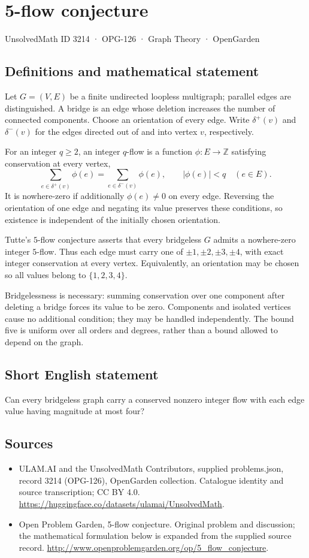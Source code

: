 \documentclass[11pt,a4paper]{article}
\begin{document}
\section*{5-flow conjecture}\label{3214}
{\small UnsolvedMath ID 3214 · OPG-126 · Graph Theory · OpenGarden}
\subsection{Definitions and mathematical statement}
Let $G=(V,E)$ be a finite undirected
loopless multigraph; parallel edges
are distinguished. A bridge is an
edge whose deletion increases the
number of connected components.
Choose an orientation of every edge.
Write $\delta^+(v)$ and $\delta^-(v)$
for the edges directed out of and
into vertex $v$, respectively.

For an integer $q\geq2$, an integer
$q$-flow is a function $\phi:E\to\mathbb Z$
satisfying conservation at every vertex,
\[
 \sum_{e\in\delta^+(v)}\phi(e)
 =\sum_{e\in\delta^-(v)}\phi(e),
 \qquad |\phi(e)|<q\quad(e\in E).
\]
It is nowhere-zero if additionally
$\phi(e)\neq0$ on every edge.
Reversing the orientation of one
edge and negating its value preserves
these conditions, so existence is
independent of the initially chosen
orientation.

Tutte's $5$-flow conjecture asserts
that every bridgeless $G$ admits a
nowhere-zero integer $5$-flow. Thus
each edge must carry one of
$\pm1,\pm2,\pm3,\pm4$, with exact
integer conservation at every vertex.
Equivalently, an orientation may be
chosen so all values belong to
$\{1,2,3,4\}$.

Bridgelessness is necessary: summing
conservation over one component after
deleting a bridge forces its value
to be zero. Components and isolated
vertices cause no additional condition;
they may be handled independently.
The bound five is uniform over all
orders and degrees, rather than a
bound allowed to depend on the graph.
\subsection{Short English statement}
Can every bridgeless graph carry a conserved nonzero integer flow with each edge value having magnitude at most four?
\subsection{Sources}
\begin{itemize}
\item[S1] ULAM.AI and the UnsolvedMath Contributors, supplied problems.json, record 3214 (OPG-126), OpenGarden collection. Catalogue identity and source transcription; CC BY 4.0.
\url{https://huggingface.co/datasets/ulamai/UnsolvedMath}.
\item[S2] Open Problem Garden, 5-flow conjecture. Original problem and discussion; the mathematical formulation below is expanded from the supplied source record.
\url{http://www.openproblemgarden.org/op/5_flow_conjecture}.
\end{itemize}
\end{document}
